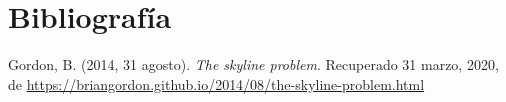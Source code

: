 \chapter{Bibliografía}

Gordon, B. (2014, 31 agosto). \textit{The skyline problem}. Recuperado 31 marzo, 2020, de \url{https://briangordon.github.io/2014/08/the-skyline-problem.html}
